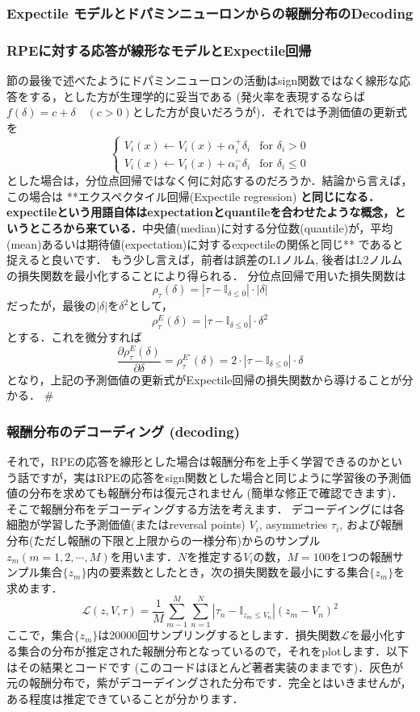 \subsubsection{Expectile モデルとドパミンニューロンからの報酬分布のDecoding}\subsubsection{RPEに対する応答が線形なモデルとExpectile回帰}節の最後で述べたようにドパミンニューロンの活動はsign関数ではなく線形な応答をする，とした方が生理学的に妥当である (発火率を表現するならば$f(\delta)=c+\delta\quad(c > 0)$とした方が良いだろうが)．それでは予測価値の更新式を 
$$ 
\begin{cases} V_{i}(x) \leftarrow V_{i}(x)+\alpha_{i}^{+}
\delta_{i} &\text{for } \delta_{i} \gt 0\\ V_{i}(x) \leftarrow V_{i}(x)+\alpha_{i}^{-} \delta_{i} &\text{for } \delta_{i} \leq 0 \end{cases} 
$$
とした場合は，分位点回帰ではなく何に対応するのだろうか．結論から言えば，この場合は **エクスペクタイル回帰(Expectile
regression)\textbf{ と同じになる．expectileという用語自体はexpectationとquantileを合わせたような概念，というところから来ている．}中央値(median)に対する分位数(quantile)が，平均(mean)あるいは期待値(expectation)に対するexpectileの関係と同じ** であると捉えると良いです．
もう少し言えば，前者は誤差のL1ノルム, 後者はL2ノルムの損失関数を最小化することにより得られる．
分位点回帰で用いた損失関数は
$$
\rho_{\tau}(\delta)=\left|\tau-\mathbb{I}_{\delta \leq 0}\right|\cdot |\delta|
$$
だったが，最後の$|\delta|$を$\delta^2$として， 
$$
\rho^E_{\tau}(\delta)=\left|\tau-\mathbb{I}_{\delta \leq
0}\right|\cdot \delta^2
$$
とする．これを微分すれば 
$$ 
\frac{\partial \rho^E_{\tau}(\delta)}{\partial \delta}=\rho_{\tau}^{E\prime}(\delta)=2 \cdot \left|\tau-\mathbb{I}_{\delta \leq 0}\right| \cdot \delta 
$$
となり，上記の予測価値の更新式がExpectile回帰の損失関数から導けることが分かる．
#\subsubsection{報酬分布のデコーディング (decoding)}それで，RPEの応答を線形とした場合は報酬分布を上手く学習できるのかという話ですが，実はRPEの応答をsign関数とした場合と同じように学習後の予測価値の分布を求めても報酬分布は復元されません (簡単な修正で確認できます)．そこで報酬分布をデコーディングする方法を考えます．
デコーデイングには各細胞が学習した予測価値(またはreversal points) $V_i$, asymmetries $\tau_i$, および報酬分布(ただし報酬の下限と上限からの一様分布)からのサンプル $z_m (m=1,2,\cdots,
M)$を用います．$N$を推定する$V_i$の数，$M=100$を1つの報酬サンプル集合$\{z_m\}$内の要素数としたとき，次の損失関数を最小にする集合$\{z_m\}$を求めます． $$ \mathcal{L}(z, V, \tau)=\frac{1}{M} \sum_{m-1}^{M} \sum_{n=1}^{N}\left|\tau_{n}-\mathbb{I}_{z_{m} \leq
V_{n}}\right|\left(z_{m}-V_{n}\right)^{2} $$ ここで，集合$\{z_m\}$は20000回サンプリングするとします．損失関数$\mathcal{L}$を最小化する集合の分布が推定された報酬分布となっているので，それをplotします．以下はその結果とコードです
(このコードはほとんど著者実装のままです)．灰色が元の報酬分布で，紫がデコーデイングされた分布です．完全とはいきませんが，ある程度は推定できていることが分かります．